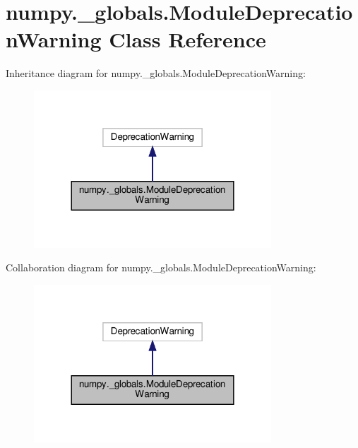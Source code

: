 \hypertarget{classnumpy_1_1__globals_1_1ModuleDeprecationWarning}{}\section{numpy.\+\_\+globals.\+Module\+Deprecation\+Warning Class Reference}
\label{classnumpy_1_1__globals_1_1ModuleDeprecationWarning}


Inheritance diagram for numpy.\+\_\+globals.\+Module\+Deprecation\+Warning\+:
\nopagebreak
\begin{figure}[H]
\begin{center}
\leavevmode
\includegraphics[width=252pt]{classnumpy_1_1__globals_1_1ModuleDeprecationWarning__inherit__graph}
\end{center}
\end{figure}


Collaboration diagram for numpy.\+\_\+globals.\+Module\+Deprecation\+Warning\+:
\nopagebreak
\begin{figure}[H]
\begin{center}
\leavevmode
\includegraphics[width=252pt]{classnumpy_1_1__globals_1_1ModuleDeprecationWarning__coll__graph}
\end{center}
\end{figure}


